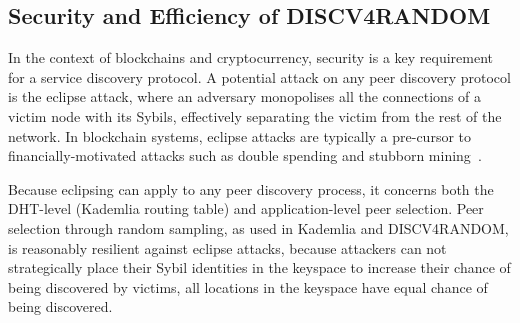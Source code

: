 
\subsection{Security and Efficiency of DISCV4RANDOM}
\label{sec:securityEfficiency}

In the context of blockchains and cryptocurrency, security is a key requirement for a service discovery protocol. A potential attack on any peer discovery protocol is the eclipse attack, where an adversary monopolises all the connections of a victim node with its Sybils, effectively separating the victim from the rest of the network. In blockchain systems, eclipse attacks are typically a pre-cursor to financially-motivated attacks such as double spending and stubborn mining~\cite{henningsen2019eclipsing}.

Because eclipsing can apply to any peer discovery process, it concerns both the DHT-level (\ie Kademlia routing table) and application-level peer selection. Peer selection through random sampling, as used in Kademlia and DISCV4RANDOM, is reasonably resilient against eclipse attacks, because attackers can not strategically place their Sybil identities in the keyspace to increase their chance of being discovered by victims, \ie all locations in the keyspace have equal chance of being discovered.



